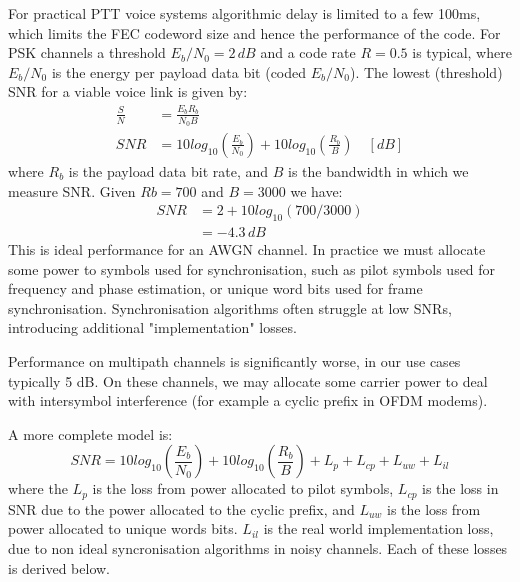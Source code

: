 \documentclass{article}
\begin{document}
For practical PTT voice systems algorithmic delay is limited to a few 100ms, which limits the FEC codeword size and hence the performance of the code.  For PSK channels a threshold $E_b/N_0=2 \, \si{dB}$ and a code rate $R=0.5$ is typical, where $E_b/N_0$ is the energy per payload data bit (coded $E_b/N_0$).  The lowest (threshold) SNR for a viable voice link is given by:
\begin{equation}
\label{eq:snr}
\begin{split}
\frac{S}{N} &= \frac{E_bR_b}{N_0B} \\
SNR &= 10log_{10}\left(\frac{E_b}{N_0}\right) + 10log_{10}\left(\frac{R_b}{B}\right) \quad [\si{dB}]
\end{split}
\end{equation}
where $R_b$ is the payload data bit rate, and $B$ is the bandwidth in which we measure SNR.  Given $Rb=700$ and $B=3000$ we have:
\begin{equation}
\begin{split}
SNR &= 2 + 10log_{10}(700/3000) \\
    &= -4.3 \, \si{dB}
\end{split}
\end{equation}
This is ideal performance for an AWGN channel.  In practice we must allocate some power to symbols used for synchronisation, such as pilot symbols used for frequency and phase estimation, or unique word bits used for frame synchronisation.  Synchronisation algorithms often struggle at low SNRs, introducing additional "implementation" losses.

Performance on multipath channels is significantly worse, in our use cases typically 5 dB.  On these channels, we may allocate some carrier power to deal with intersymbol interference (for example a cyclic prefix in OFDM modems).

A more complete model is:
\begin{equation}
\label{eq:snr_all}
SNR = 10log_{10}\left(\frac{E_b}{N_0}\right) + 10log_{10}\left(\frac{R_b}{B}\right) + L_p + L_{cp} + L_{uw} + L_{il}
\end{equation}
where the $L_p$ is the loss from power allocated to pilot symbols,  $L_{cp}$ is the loss in SNR due to the power allocated to the cyclic prefix, and $L_{uw}$ is the loss from power allocated to unique words bits. $L_{il}$ is the real world implementation loss, due to non ideal syncronisation algorithms in noisy channels.  Each of these losses is derived below.
\end{document}

